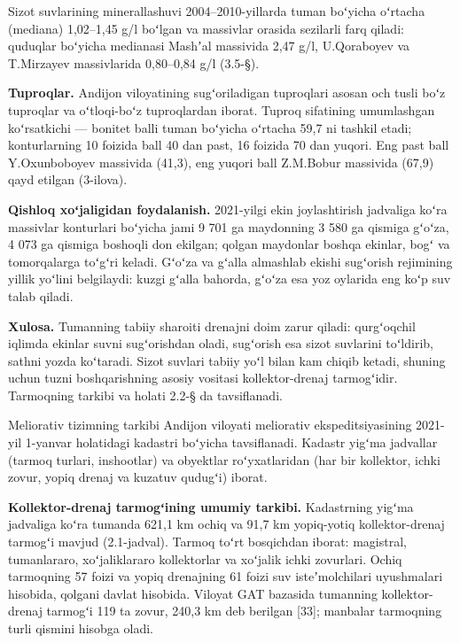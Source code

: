 Sizot suvlarining minerallashuvi 2004--2010-yillarda tuman boʻyicha
oʻrtacha (mediana) 1,02--1,45 g/l boʻlgan va massivlar orasida sezilarli
farq qiladi: quduqlar boʻyicha medianasi Mashʼal massivida 2,47 g/l,
U.Qoraboyev va T.Mirzayev massivlarida 0,80--0,84 g/l (3.5-§).

\textbf{Tuproqlar.} Andijon viloyatining sugʻoriladigan tuproqlari
asosan och tusli boʻz tuproqlar va oʻtloqi-boʻz tuproqlardan iborat.
Tuproq sifatining umumlashgan koʻrsatkichi --- bonitet balli tuman
boʻyicha oʻrtacha 59,7 ni tashkil etadi; konturlarning 10 foizida ball
40 dan past, 16 foizida 70 dan yuqori. Eng past ball Y.Oxunboboyev
massivida (41,3), eng yuqori ball Z.M.Bobur massivida (67,9) qayd
etilgan (3-ilova).

\textbf{Qishloq xoʻjaligidan foydalanish.} 2021-yilgi ekin joylashtirish
jadvaliga koʻra massivlar konturlari boʻyicha jami 9 701 ga maydonning 3
580 ga qismiga gʻoʻza, 4 073 ga qismiga boshoqli don ekilgan; qolgan
maydonlar boshqa ekinlar, bogʻ va tomorqalarga toʻgʻri keladi. Gʻoʻza va
gʻalla almashlab ekishi sugʻorish rejimining yillik yoʻlini belgilaydi:
kuzgi gʻalla bahorda, gʻoʻza esa yoz oylarida eng koʻp suv talab qiladi.

\textbf{Xulosa.} Tumanning tabiiy sharoiti drenajni doim zarur qiladi:
qurgʻoqchil iqlimda ekinlar suvni sugʻorishdan oladi, sugʻorish esa
sizot suvlarini toʻldirib, sathni yozda koʻtaradi. Sizot suvlari tabiiy
yoʻl bilan kam chiqib ketadi, shuning uchun tuzni boshqarishning asosiy
vositasi kollektor-drenaj tarmogʻidir. Tarmoqning tarkibi va holati
2.2-§ da tavsiflanadi.


Meliorativ tizimning tarkibi Andijon viloyati meliorativ
ekspeditsiyasining 2021-yil 1-yanvar holatidagi kadastri boʻyicha
tavsiflanadi. Kadastr yigʻma jadvallar (tarmoq turlari, inshootlar) va
obyektlar roʻyxatlaridan (har bir kollektor, ichki zovur, yopiq drenaj
va kuzatuv qudugʻi) iborat.

\textbf{Kollektor-drenaj tarmogʻining umumiy tarkibi.} Kadastrning
yigʻma jadvaliga koʻra tumanda 621,1 km ochiq va 91,7 km yopiq-yotiq
kollektor-drenaj tarmogʻi mavjud (2.1-jadval). Tarmoq toʻrt bosqichdan
iborat: magistral, tumanlararo, xoʻjaliklararo kollektorlar va xoʻjalik
ichki zovurlari. Ochiq tarmoqning 57 foizi va yopiq drenajning 61 foizi
suv isteʼmolchilari uyushmalari hisobida, qolgani davlat hisobida.
Viloyat GAT bazasida tumanning kollektor-drenaj tarmogʻi 119 ta zovur,
240,3 km deb berilgan {[}33{]}; manbalar tarmoqning turli qismini
hisobga oladi.

